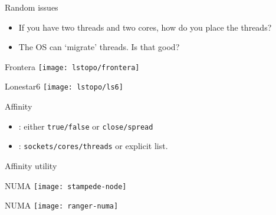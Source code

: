 
\begin{numberedframe}{Random issues}
  \begin{itemize}
  \item If you have two threads and two cores, how do you place the threads?
  \item The OS can `migrate' threads. Is that good?
  \end{itemize}
\end{numberedframe}

\begin{numberedframe}{Frontera}
\texttt{[image: lstopo/frontera]}
\end{numberedframe}

\begin{numberedframe}{Lonestar6}
\texttt{[image: lstopo/ls6]}
\end{numberedframe}

\begin{numberedframe}{Affinity}
  \begin{itemize}
  \item
    : either \lstinline{true/false} or \lstinline{close/spread}
  \item 
    : \lstinline{sockets/cores/threads} or explicit list.
  \end{itemize}
\end{numberedframe}

\begin{numberedframe}{Affinity utility}    

\end{numberedframe}

\begin{numberedframe}{NUMA}
  \texttt{[image: stampede-node]}
\end{numberedframe}

\begin{numberedframe}{NUMA}
  \texttt{[image: ranger-numa]}
\end{numberedframe}


